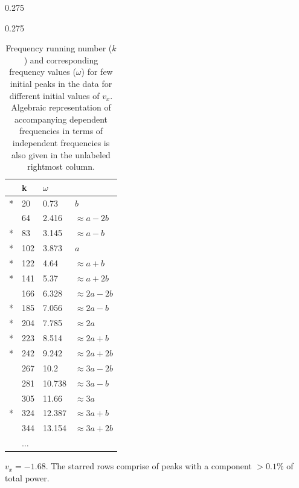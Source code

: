\documentclass[a4paper]{article}
\begin{document}
\begin{table}
\begin{subtable} [h] {0.275\linewidth}
				\label{table:task2_2}
			\end{subtable}
			\hspace{0.05\linewidth}
			\begin{subtable} [h] {0.275\linewidth}
				\centering
				\begin{tabular} {l l l l}
					\toprule
					& \textbf{k} & \textbf{\(\omega\)} &  \\
					\midrule
					* & 20 & 0.73 & \(b\) \\
					& 64 & 2.416 & \(\approx a-2b\) \\
					* & 83 & 3.145 & \(\approx a-b\) \\
					* & 102 & 3.873 & \(a\) \\
					* & 122 & 4.64 & \(\approx a+b\) \\
					* & 141 & 5.37 & \(\approx a+2b\) \\
					& 166 & 6.328 & \(\approx 2a-2b\) \\
					* & 185 & 7.056 & \(\approx 2a-b\) \\
					* & 204 & 7.785 & \(\approx 2a\) \\
					* & 223 & 8.514 & \(\approx 2a+b\) \\
					* & 242 & 9.242 & \(\approx 2a+2b\) \\
					& 267 & 10.2 & \(\approx 3a-2b\) \\          
					& 281 & 10.738 & \(\approx 3a-b\) \\ 
					& 305 & 11.66 & \(\approx 3a\) \\
					* & 324 & 12.387 & \(\approx 3a+b\) \\
					& 344 & 13.154 & \(\approx 3a+2b\) \\
					& \(\dots\) &  & \\
					\bottomrule
				\end{tabular}
				\caption{\(v_x = -1.68\). The starred rows comprise of peaks with a component \(>0.1\%\) of total power.}
				\label{table:task2_3}
			\end{subtable}
			\caption{Frequency running number (\(k\)) and corresponding frequency values (\(\omega\)) for few initial peaks in the data for different initial values of \(v_x\). Algebraic representation of accompanying dependent frequencies in terms of independent frequencies is also given in the unlabeled rightmost column.}
			\label{table:task2_1-3}
		\end{table}
		
\end{document}
